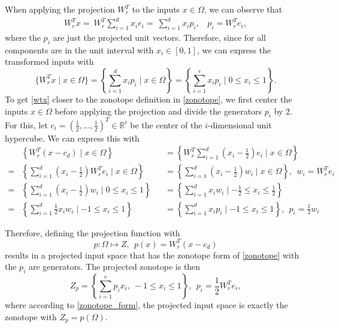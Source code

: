 \documentclass[
  a4paper,  %
  twoside,  %
  bibliography=totoc,
  headsepline,
  cleardoublepage=empty,
  parskip=half,
  draft=false
]{scrbook}
\begin{document}
When applying the projection $W_r^T$ to the inputs $x \in \Omega$, we can observe that
\begin{equation}
\begin{split}
W_r^T x=~W_r^T \sum_{i=1}^d x_i e_i=~\sum_{i=1}^d x_i p_i , ~~~~ p_i=W_r^T e_i,
\nonumber
\end{split}
\end{equation}
where the $p_i$ are just the projected unit vectors.
Therefore, since for all components are in the unit interval with $x_i \in [0,1]$, we can express the transformed inputs with
\begin{equation}
\{W_r^T x \mid x \in \Omega\}=\left\{\sum_{i=1}^d x_i p_i \mid x \in \Omega \right\}=\left\{ \sum_{i=1}^r x_i p_i \mid 0 \leq x_i \leq 1\right\}.
\label{wtx}
\end{equation}
To get \cref{wtx} closer to the zonotope definition in \cref{zonotope}, we first center the inputs $x \in \Omega$ before applying the projection and divide the generators $p_i$ by 2.
For this, let $c_i=(\frac{1}{2}, \dots, \frac{1}{2})^T\in \mathbb{R}^i$ be the center of the $i$-dimensional unit hypercube.
We can express this with
\begin{equation}
\begin{alignedat}{2}
&\left\{W_r^T (x - c_d) \mid x \in \Omega\right\}&&=\left\{W_r^T \sum_{i=1}^d \left(x_i - \frac{1}{2}\right) e_i \mid x \in \Omega \right\}\\
=&\left\{\sum_{i=1}^d \left(x_i - \frac{1}{2}\right) W_r^T e_i \mid x \in \Omega \right\}&&=\left\{\sum_{i=1}^d \left(x_i - \frac{1}{2}\right) w_i \mid x \in \Omega \right\}, ~~ w_i=W_r^T e_i\\
=&\left\{\sum_{i=1}^d \left(x_i - \frac{1}{2}\right) w_i \mid 0 \leq x_i \leq 1 \right\}&&=\left\{\sum_{i=1}^d x_i w_i \mid -\frac{1}{2} \leq x_i \leq \frac{1}{2} \right\}\\
=&\left\{\sum_{i=1}^d \frac{1}{2} x_i w_i \mid -1 \leq x_i \leq 1 \right\}&&=\left\{\sum_{i=1}^d x_i p_i \mid -1 \leq x_i \leq 1 \right\}, ~~ p_i=\frac{1}{2} w_i
\label{zonotope_form}
\end{alignedat}
\end{equation}

Therefore, defining the projection function with
\begin{equation}
p \colon \Omega \mapsto Z, ~~ p(x)=W_r^T (x-c_d)
\nonumber
\end{equation}
results in a projected input space that has the zonotope form of \cref{zonotope} with the $p_i$ are generators.
The projected zonotope is then
\begin{equation}
Z_{p}=\left\{\sum_{i=1}^r p_i x_i , ~ -1 \leq x_i \leq 1\right\}, ~~ p_i=\frac{1}{2} W_r^T e_i,
\nonumber
\end{equation}
where according to \cref{zonotope_form}, the projected input space is exactly the zonotope with $Z_{p}=p(\Omega)$.
\end{document}
